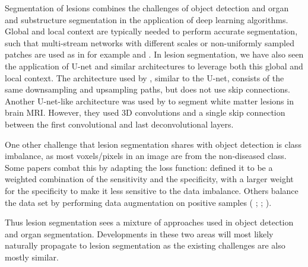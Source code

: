 \documentclass{nitk}
\begin{document}
Segmentation of lesions combines the challenges of object detection and organ and substructure segmentation in the application of deep learning algorithms. Global and local context are typically needed to perform accurate segmentation, such that multi-stream networks with different scales or non-uniformly sampled patches are used as in for example \citet{kamnitsas2017efficient} and \citet{ghafoorian2016non} . In lesion segmentation, we have also seen the application of U-net and similar architectures to leverage both this global and local context. The architecture used by \citet{wang2015unified}, similar to the U-net, consists of the same downsampling and upsampling paths, but does not use skip connections. Another U-net-like architecture was used by \citet{brosch2016deep} to segment white matter lesions in brain MRI. However, they used 3D convolutions and a single skip connection between the first convolutional and last deconvolutional layers.\\ \par

One other challenge that lesion segmentation shares with object detection is class imbalance, as most voxels/pixels in an image are from the non-diseased class. Some papers combat this by adapting the loss function: \citet{brosch2016deep} defined it to be a weighted combination of the sensitivity and the specificity, with a larger weight for the specificity to make it less sensitive to the data imbalance. Others balance the data set by performing data augmentation on positive samples ( \citet{kamnitsas2017efficient}; \citet{litjens2016deep}; \citet{pereira2016brain} ). \\ \par

Thus lesion segmentation sees a mixture of approaches used in
object detection and organ segmentation. Developments in these two areas will most likely naturally propagate to lesion segmentation as the existing challenges are also mostly similar.
    
\end{document}
